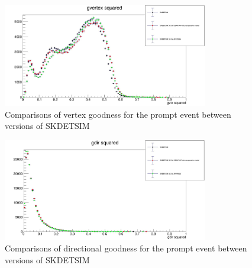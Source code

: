 \begin{figure}
    \centering
    \includegraphics[width=0.8\textwidth]{Figures/gvtx_squared.jpeg}
    \caption{Comparisons of vertex goodness for the prompt event between versions of SKDETSIM}
    \label{fig:gvtx_squared}

\end{figure}

\begin{figure}
    \centering
    \includegraphics[width=0.8\textwidth]{Figures/gdir_squared.jpeg}
    \caption{Comparisons of directional goodness for the prompt event between versions of SKDETSIM}
    \label{fig:gdir_squared}

\end{figure}

